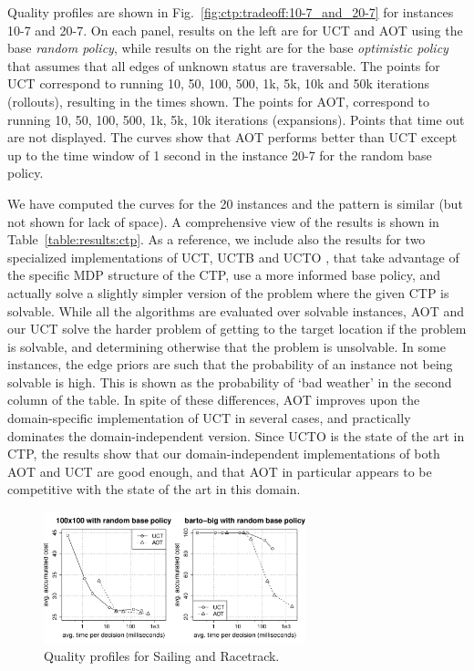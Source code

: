 \documentclass[letterpaper]{article}
\newcommand{\Omit}[1]{}
\begin{document}
Quality profiles are shown in Fig.~\ref{fig:ctp:tradeoff:10-7_and_20-7}
for instances 10-7 and 20-7.
On each panel, results on the left are for UCT and AOT using the base
\emph{random policy}, while results on the right are for the base \emph{optimistic policy}
that assumes that  all edges of unknown status are traversable.
The points for  UCT correspond to running 10, 50, 100, 500, 1k, 5k, 10k and 50k iterations (rollouts),
resulting in the times shown. The points for  AOT, correspond to running  10, 50, 100, 500, 1k, 5k, 10k iterations (expansions).
Points that time out are not displayed. %
The curves show  that AOT  performs better than  UCT
except up to the time window of 1 second in  the instance 20-7 for the random base policy.
\Omit{
window where AOT takes over. The first points for AOT appear later in time that the first ones
for UCT because while 10 iterations of UCT introduce at most 10 nodes in the graph,
10 iterations of AOT introduce up to $|A||S|$ nodes, where $A$ and $S$ are the number of
actions and states. The curves show however  that the more expensive expansions in AOT
can pay off.}
We have computed the curves for the 20 instances and the pattern is similar (but not shown for lack of space).
A comprehensive view of the results  is shown in Table~\ref{table:results:ctp}.
As a reference, we include also  the results for  two specialized implementations of UCT,
UCTB and UCTO  \cite{malte:ctp}, that take advantage of the specific MDP structure of the CTP,
use a more informed base policy, and actually solve a slightly simpler version of the
problem where the given CTP is solvable. While all the algorithms are evaluated over
solvable instances, AOT and our UCT solve the harder problem of getting to the target
location if the problem is solvable, and determining otherwise that the problem is unsolvable.
In some instances, the edge  priors are such that the  probability of an instance not being solvable
is high. This is shown as the probability of `bad weather' in the second column of the table.
In spite of these differences, AOT improves upon the domain-specific implementation
of UCT in several  cases, and practically dominates the domain-independent version.
Since UCTO is the state of the art in CTP, the  results show that
our domain-independent implementations of both AOT and UCT
are good enough, and that AOT in particular appears to be
competitive with the state of the art in this domain.

\begin{figure}
\centering
\includegraphics[width=3in,clip=on,trim=.75cm 1cm 1.5cm 1cm]{combined.pdf}
\caption{Quality profiles for Sailing and Racetrack.}
\label{fig:combined}
\end{figure}
\end{document}
